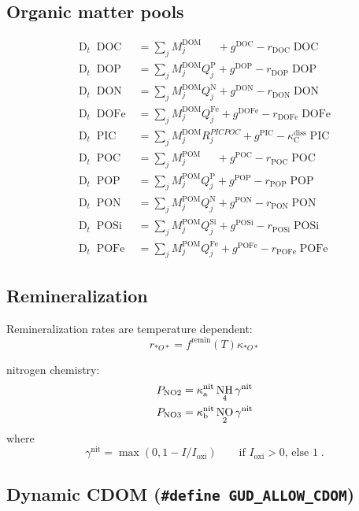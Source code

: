 \documentclass[11pt,letterpaper,english]{article}
\newcommand{\qtext}[1]{\qquad\text{#1}}
\def\|#1|{\operatorname{#1}}
\newcommand{\DDt}{\operatorname{D}_t}
\DeclareMathOperator{\Fe}{Fe}
\DeclareMathOperator{\Si}{Si}
\DeclareMathOperator{\NH}{NH}
\DeclareMathOperator{\NO}{NO}
\DeclareMathOperator{\DOM}{DOM}
\DeclareMathOperator{\DOC}{DOC}
\DeclareMathOperator{\DOP}{DOP}
\DeclareMathOperator{\DON}{DON}
\DeclareMathOperator{\DOFe}{DOFe}
\DeclareMathOperator{\POM}{POM}
\DeclareMathOperator{\POP}{POP}
\DeclareMathOperator{\PON}{PON}
\DeclareMathOperator{\POFe}{POFe}
\DeclareMathOperator{\POSi}{POSi}
\DeclareMathOperator{\PIC}{PIC}
\DeclareMathOperator{\POC}{POC}
\DeclareMathOperator{\NOii}{NO2}
\DeclareMathOperator{\NOiii}{NO3}
\newcommand{\N}{\mathrm{N}}
\newcommand{\C}{\mathrm{C}}
\renewcommand{\P}{\mathrm{P}}
\newcommand{\diss}{{\text{diss}}}
\newcommand{\nit}{{\text{nit}}}
\newcommand{\oxi}{{\text{oxi}}}
\newcommand{\remin}{{\text{remin}}}
\begin{document}
\subsection{Organic matter pools}

\begin{align*}
  \DDt \DOC  &= \sum_j M_j^{\DOM} \;\;\;\;\;+ g^{\DOC}  - r_{\DOC} \DOC
\\
  \DDt \DOP  &= \sum_j M_j^{\DOM} Q_j^{\P}  + g^{\DOP}  - r_{\DOP} \DOP
\\
  \DDt \DON  &= \sum_j M_j^{\DOM} Q_j^{\N}  + g^{\DON}  - r_{\DON} \DON
\\
  \DDt \DOFe &= \sum_j M_j^{\DOM} Q_j^{\Fe} + g^{\DOFe} - r_{\DOFe} \DOFe
\\
  \DDt \PIC  &= \sum_j M_j^{\DOM} R_j^{PICPOC} + g^{\PIC} - \kappa^\diss_\C \PIC
\\
  \DDt \POC  &= \sum_j M_j^{\POM} \;\;\;\;\;+ g^{\POC}  - r_{\POC} \POC
\\
  \DDt \POP  &= \sum_j M_j^{\POM} Q_j^{\P}  + g^{\POP}  - r_{\POP} \POP
\\
  \DDt \PON  &= \sum_j M_j^{\POM} Q_j^{\N}  + g^{\PON}  - r_{\PON} \PON
\\
  \DDt \POSi &= \sum_j M_j^{\POM} Q_j^{\Si} + g^{\POSi} - r_{\POSi} \POSi
\\
  \DDt \POFe &= \sum_j M_j^{\POM} Q_j^{\Fe} + g^{\POFe} - r_{\POFe} \POFe
\end{align*}



\subsection{Remineralization}

Remineralization rates are temperature dependent:
\[
  r_{*O*} = f^\remin(T) \kappa_{*O*}
\]

nitrogen chemistry:
\begin{align*}
  P_{\NOii}  &= \kappa^{\|nit|}_{\rm a} \NH_4 \gamma^\nit \\
  P_{\NOiii} &= \kappa^{\|nit|}_{\rm b} \NO_2 \gamma^\nit
\end{align*}
where
\[
  \gamma^\nit = \max(0, 1-I/I_\oxi)
  \qtext{if } I_\oxi > 0 \text{, else } 1 \;.
\]



\subsection{Dynamic CDOM ({\tt \#define GUD\_ALLOW\_CDOM})}
\end{document}
